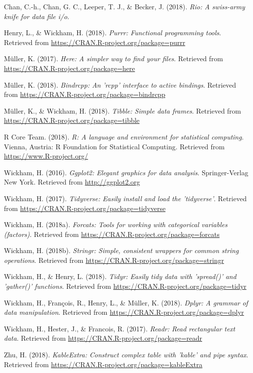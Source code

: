 \documentclass[man]{apa6}
\begin{document}
\hypertarget{ref-R-rio}{}
Chan, C.-h., Chan, G. C., Leeper, T. J., \& Becker, J. (2018).
\emph{Rio: A swiss-army knife for data file i/o}.

\hypertarget{ref-R-purrr}{}
Henry, L., \& Wickham, H. (2018). \emph{Purrr: Functional programming
tools}. Retrieved from \url{https://CRAN.R-project.org/package=purrr}

\hypertarget{ref-R-here}{}
Müller, K. (2017). \emph{Here: A simpler way to find your files}.
Retrieved from \url{https://CRAN.R-project.org/package=here}

\hypertarget{ref-R-bindrcpp}{}
Müller, K. (2018). \emph{Bindrcpp: An 'rcpp' interface to active
bindings}. Retrieved from
\url{https://CRAN.R-project.org/package=bindrcpp}

\hypertarget{ref-R-tibble}{}
Müller, K., \& Wickham, H. (2018). \emph{Tibble: Simple data frames}.
Retrieved from \url{https://CRAN.R-project.org/package=tibble}

\hypertarget{ref-R-base}{}
R Core Team. (2018). \emph{R: A language and environment for statistical
computing}. Vienna, Austria: R Foundation for Statistical Computing.
Retrieved from \url{https://www.R-project.org/}

\hypertarget{ref-R-ggplot2}{}
Wickham, H. (2016). \emph{Ggplot2: Elegant graphics for data analysis}.
Springer-Verlag New York. Retrieved from \url{http://ggplot2.org}

\hypertarget{ref-R-tidyverse}{}
Wickham, H. (2017). \emph{Tidyverse: Easily install and load the
'tidyverse'}. Retrieved from
\url{https://CRAN.R-project.org/package=tidyverse}

\hypertarget{ref-R-forcats}{}
Wickham, H. (2018a). \emph{Forcats: Tools for working with categorical
variables (factors)}. Retrieved from
\url{https://CRAN.R-project.org/package=forcats}

\hypertarget{ref-R-stringr}{}
Wickham, H. (2018b). \emph{Stringr: Simple, consistent wrappers for
common string operations}. Retrieved from
\url{https://CRAN.R-project.org/package=stringr}

\hypertarget{ref-R-tidyr}{}
Wickham, H., \& Henry, L. (2018). \emph{Tidyr: Easily tidy data with
'spread()' and 'gather()' functions}. Retrieved from
\url{https://CRAN.R-project.org/package=tidyr}

\hypertarget{ref-R-dplyr}{}
Wickham, H., François, R., Henry, L., \& Müller, K. (2018). \emph{Dplyr:
A grammar of data manipulation}. Retrieved from
\url{https://CRAN.R-project.org/package=dplyr}

\hypertarget{ref-R-readr}{}
Wickham, H., Hester, J., \& Francois, R. (2017). \emph{Readr: Read
rectangular text data}. Retrieved from
\url{https://CRAN.R-project.org/package=readr}

\hypertarget{ref-R-kableExtra}{}
Zhu, H. (2018). \emph{KableExtra: Construct complex table with 'kable'
and pipe syntax}. Retrieved from
\url{https://CRAN.R-project.org/package=kableExtra}

\endgroup
\end{document}
